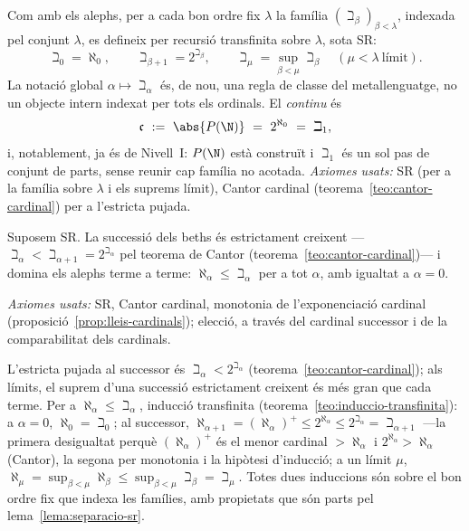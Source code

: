 \begin{definicio}\label{def:beths}
Com amb els alephs, per a cada bon ordre fix \(\lambda\) la família
\((\beth_\beta)_{\beta<\lambda}\), indexada pel conjunt \(\lambda\), es
defineix per recursió transfinita sobre \(\lambda\), sota SR:
\[
\beth_0=\aleph_0,
\qquad
\beth_{\beta+1}=2^{\beth_\beta},
\qquad
\beth_\mu=\sup_{\beta<\mu}\beth_\beta\quad(\mu<\lambda\ \text{límit}).
\]
La notació global \(\alpha\mapsto\beth_\alpha\) és, de nou, una regla de
classe del metallenguatge, no un objecte intern indexat per tots els
ordinals. El \emph{continu} és
\[
\mathfrak c\ :=\ \abs{P(\N)}\ =\ 2^{\aleph_0}\ =\ \beth_1 ,
\]
i, notablement, ja és de Nivell~I: \(P(\N)\) està construït i \(\beth_1\) és un
sol pas de conjunt de parts, sense reunir cap família no acotada.
\emph{Axiomes usats:} SR (per a la família sobre \(\lambda\) i els suprems
límit), Cantor cardinal (teorema~\ref{teo:cantor-cardinal}) per a l'estricta
pujada.
\end{definicio}

\begin{proposicio}\label{prop:beths}
Suposem SR. La successió dels beths és estrictament creixent
---\(\beth_\alpha<\beth_{\alpha+1}=2^{\beth_\alpha}\) pel teorema de Cantor
(teorema~\ref{teo:cantor-cardinal})--- i domina els alephs terme a terme:
\(\aleph_\alpha\le\beth_\alpha\) per a tot \(\alpha\), amb igualtat a
\(\alpha=0\).\par
\emph{Axiomes usats:} SR, Cantor cardinal, monotonia de l'exponenciació
cardinal (proposició~\ref{prop:lleis-cardinals}); elecció, a través del
cardinal successor i de la comparabilitat dels cardinals.
\end{proposicio}

\begin{prova}
L'estricta pujada al successor és \(\beth_\alpha<2^{\beth_\alpha}\)
(teorema~\ref{teo:cantor-cardinal}); als límits, el suprem d'una successió
estrictament creixent és més gran que cada terme. Per a
\(\aleph_\alpha\le\beth_\alpha\), inducció transfinita
(teorema~\ref{teo:induccio-transfinita}): a \(\alpha=0\), \(\aleph_0=\beth_0\); al
successor, \(\aleph_{\alpha+1}=(\aleph_\alpha)^{+}\le 2^{\aleph_\alpha}\le
2^{\beth_\alpha}=\beth_{\alpha+1}\) ---la primera desigualtat perquè
\((\aleph_\alpha)^{+}\) és el menor cardinal \(>\aleph_\alpha\) i
\(2^{\aleph_\alpha}>\aleph_\alpha\) (Cantor), la segona per monotonia i la
hipòtesi d'inducció; a un límit \(\mu\),
\(\aleph_\mu=\sup_{\beta<\mu}\aleph_\beta\le\sup_{\beta<\mu}\beth_\beta=\beth_\mu\).
Totes dues induccions són sobre el bon ordre fix que indexa les famílies, amb
propietats que són parts pel lema~\ref{lema:separacio-sr}.
\end{prova}

